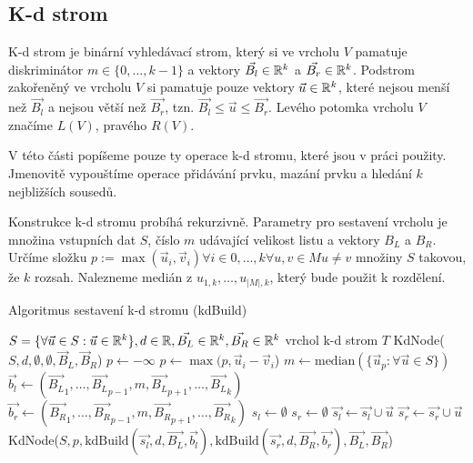 \subsection{K-d strom}

K-d strom je binární vyhledávací strom, který si ve vrcholu $V$ pamatuje diskriminátor $m \in \{0, \ldots, k-1\}$ a vektory $\vec{B_l} \in \mathbb{R}^k$ a $\vec{B_r} \in \mathbb{R}^k$. Podstrom zakořeněný ve vrcholu $V$ si pamatuje pouze vektory $\vec{u} \in \mathbb{R}^k$, které nejsou menší než $\vec{B_l}$ a nejsou větší než $\vec{B_r}$, tzn. $\vec{B_l} \leq \vec{u} \leq \vec{B_r}$. Levého potomka vrcholu $V$ značíme $L(V)$, pravého $R(V)$.

V této části popíšeme pouze ty operace k-d stromu, které jsou v práci použity. Jmenovitě vypouštíme operace přidávání prvku, mazání prvku a hledání $k$ nejbližších sousedů.

  Konstrukce k-d stromu probíhá rekurzivně. Parametry pro sestavení vrcholu je množina vstupních dat $S$, číslo $m$ udávající velikost listu a vektory $B_L$ a $B_R$. Určíme složku $p := \max(\vec{u}_i, \vec{v}_i) \forall i \in {0,\ldots,k} \forall u, v \in M u \neq v$ množiny $S$ takovou, že  $k$ rozsah. Nalezneme medián z $u_{1,k}, \ldots, u_{|M|,k}$, který bude použit k rozdělení.

\begin{algorithm}[h!]
  \caption{Algoritmus sestavení k-d stromu (kdBuild)}
  \label{algo:kd-tree-build}
  \begin{algorithmic}
    \REQUIRE $S = \{\forall \vec{u} \in S: \vec{u} \in \mathbb{R}^k\}, d \in \mathbb{R}, \vec{B_L} \in \mathbb{R}^k, \vec{B_R} \in \mathbb{R}^k$
    \ENSURE vrchol k-d strom $T$
      \RETURN KdNode($S, d, \emptyset, \emptyset, \vec{B}_L, \vec{B}_R$)
    \ENDIF
    \STATE $p \leftarrow -\infty$
        \STATE $p \leftarrow \max(p, \vec{u}_i - \vec{v}_i$)
      \ENDFOR
    \ENDFOR
    \STATE $m \leftarrow \textrm{median}(\{\vec{u}_p: \forall \vec{u} \in S\})$ 
    \STATE $\vec{b_l} \leftarrow (\vec{B_L}_1, \ldots, \vec{B_L}_{p-1}, m, \vec{B_L}_{p+1}, \ldots, \vec{B_L}_k)$
    \STATE $\vec{b_r} \leftarrow (\vec{B_R}_1, \ldots, \vec{B_R}_{p-1}, m, \vec{B_R}_{p+1}, \ldots, \vec{B_R}_k)$
    \STATE $s_l \leftarrow \emptyset$
    \STATE $s_r \leftarrow \emptyset$
        \STATE $\vec{s_l} \leftarrow \vec{s_l} \cup \vec{u}$
      \ELSE
        \STATE $\vec{s_r} \leftarrow \vec{s_r} \cup \vec{u}$
      \ENDIF
    \ENDFOR
    \RETURN KdNode($S, p, \textrm{kdBuild}(\vec{s_l}, d, \vec{B_L}, \vec{b_l}), \textrm{kdBuild}(\vec{s_r}, d, \vec{B_R}, \vec{b_r}), \vec{B_L}, \vec{B_R}$)
  \end{algorithmic}

\end{algorithm}

